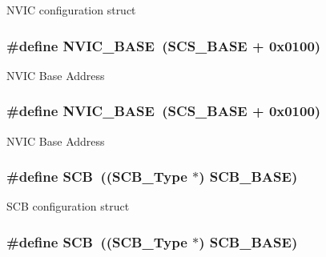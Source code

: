 N\-V\-I\-C configuration struct \hypertarget{group___c_m_s_i_s___c_m3__core__register_gaa0288691785a5f868238e0468b39523d}{
\subsubsection[{N\-V\-I\-C\-\_\-\-B\-A\-S\-E}]{\setlength{\rightskip}{0pt plus 5cm}\#define N\-V\-I\-C\-\_\-\-B\-A\-S\-E~({\bf S\-C\-S\-\_\-\-B\-A\-S\-E} +  0x0100)}}\label{group___c_m_s_i_s___c_m3__core__register_gaa0288691785a5f868238e0468b39523d}
N\-V\-I\-C Base Address \hypertarget{group___c_m_s_i_s___c_m3__core__register_gaa0288691785a5f868238e0468b39523d}{
\subsubsection[{N\-V\-I\-C\-\_\-\-B\-A\-S\-E}]{\setlength{\rightskip}{0pt plus 5cm}\#define N\-V\-I\-C\-\_\-\-B\-A\-S\-E~({\bf S\-C\-S\-\_\-\-B\-A\-S\-E} +  0x0100)}}\label{group___c_m_s_i_s___c_m3__core__register_gaa0288691785a5f868238e0468b39523d}
N\-V\-I\-C Base Address \hypertarget{group___c_m_s_i_s___c_m3__core__register_gaaaf6477c2bde2f00f99e3c2fd1060b01}{
\subsubsection[{S\-C\-B}]{\setlength{\rightskip}{0pt plus 5cm}\#define S\-C\-B~(({\bf S\-C\-B\-\_\-\-Type} $\ast$)           {\bf S\-C\-B\-\_\-\-B\-A\-S\-E})}}\label{group___c_m_s_i_s___c_m3__core__register_gaaaf6477c2bde2f00f99e3c2fd1060b01}
S\-C\-B configuration struct \hypertarget{group___c_m_s_i_s___c_m3__core__register_gaaaf6477c2bde2f00f99e3c2fd1060b01}{
\subsubsection[{S\-C\-B}]{\setlength{\rightskip}{0pt plus 5cm}\#define S\-C\-B~(({\bf S\-C\-B\-\_\-\-Type} $\ast$)           {\bf S\-C\-B\-\_\-\-B\-A\-S\-E})}}\label{group___c_m_s_i_s___c_m3__core__register_gaaaf6477c2bde2f00f99e3c2fd1060b01}
